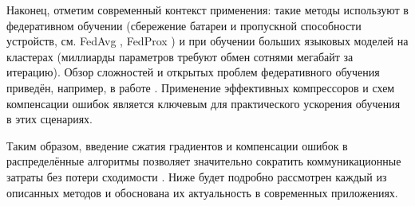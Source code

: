     Наконец, отметим современный контекст применения: такие методы используют в федеративном обучении (сбережение батареи и пропускной способности устройств, см. FedAvg \cite{McMahan2017}, FedProx \cite{Li2020}) и при обучении больших языковых моделей на кластерах (миллиарды параметров требуют обмен сотнями мегабайт за итерацию). Обзор сложностей и открытых проблем федеративного обучения приведён, например, в работе \cite{Kairouz2019}. Применение эффективных компрессоров и схем компенсации ошибок является ключевым для практического ускорения обучения в этих сценариях.

    Таким образом, введение сжатия градиентов и компенсации ошибок в распределённые алгоритмы позволяет значительно сократить коммуникационные затраты без потери сходимости \cite{Richtarik2021,Beznosikov2023}. Ниже будет подробно рассмотрен каждый из описанных методов и обоснована их актуальность в современных приложениях.

